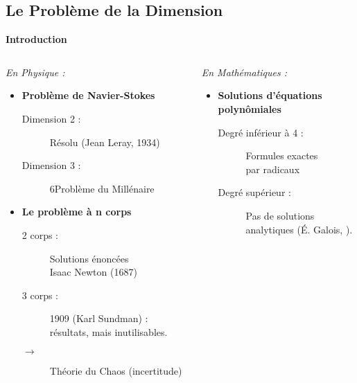 \documentclass[8pt,a9paper]{beamer} \usepackage[utf8]{inputenc} \usepackage[francais]{babel} \usepackage[T1]{fontenc}
\newcommand{\titp}[1]{\begin{center}\large{\textbf{#1}}\end{center}}
\begin{document}
\subsection{Le Problème de la Dimension}
\begin{frame}
\titp{Introduction}
	\begin{columns}[t]
	\begin{column}{6.4cm}
		\begin{center}\emph{En Physique :}\end{center}
		\begin{itemize}
		\item \textbf{Problème de Navier-Stokes}
		\begin{description}
		\item[Dimension 2 :] Résolu (Jean Leray, 1934)
		\item[] 
		\item[]	
		\item[Dimension 3 :] 6\ieme  Problème du Millénaire
		\item[] 
		\item[] 
		\end{description}
		\item \textbf{Le problème à n corps}
		\begin{description}
		\item[2 corps :] Solutions énoncées \\ Isaac Newton (1687)
		\item[]	
		\item[3 corps :] 1909 (Karl Sundman) : résultats, mais inutilisables.
		\item[$\rightarrow$] Théorie du Chaos (incertitude)
		\end{description}
		\end{itemize}
	\end{column}
	\begin{column}{6.4cm}
		\begin{center}\emph{En Mathématiques :}\end{center}
		\begin{itemize}
		\item \textbf{Solutions d'équations polynômiales}
		\begin{description}
		\item[Degré inférieur à 4 :] Formules exactes\\ par radicaux
		\item[]	
		\item[Degré supérieur :] Pas de solutions analytiques (É. Galois, \uppercase\expandafter{}\ieme).

\end{description}
\end{itemize}
\end{column}
\end{columns}
\end{frame}
\end{document}
